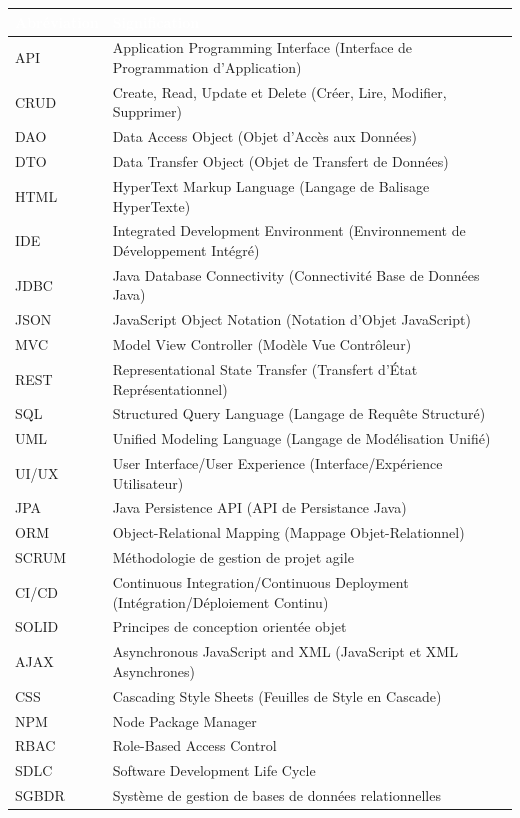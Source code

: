 \documentclass[12pt,a4paper,twoside,openright]{report}
\begin{document}
\begin{longtable}[]{@{}
  >{\raggedright\arraybackslash}p{}
  >{\raggedright\arraybackslash}p{}@{}}
\toprule
\rowcolor{capgeminiblue}
\textcolor{white}{\textbf{Abréviation}} & \textcolor{white}{\textbf{Signification}} \\
\midrule
\endhead
\rowcolor{lightgray}
API & Application Programming Interface (Interface de Programmation d'Application) \\
CRUD & Create, Read, Update et Delete (Créer, Lire, Modifier, Supprimer) \\
\rowcolor{lightgray}
DAO & Data Access Object (Objet d'Accès aux Données) \\
DTO & Data Transfer Object (Objet de Transfert de Données) \\
\rowcolor{lightgray}
HTML & HyperText Markup Language (Langage de Balisage HyperTexte) \\
IDE & Integrated Development Environment (Environnement de Développement Intégré) \\
\rowcolor{lightgray}
JDBC & Java Database Connectivity (Connectivité Base de Données Java) \\
JSON & JavaScript Object Notation (Notation d'Objet JavaScript) \\
\rowcolor{lightgray}
MVC & Model View Controller (Modèle Vue Contrôleur) \\
REST & Representational State Transfer (Transfert d'État Représentationnel) \\
\rowcolor{lightgray}
SQL & Structured Query Language (Langage de Requête Structuré) \\
UML & Unified Modeling Language (Langage de Modélisation Unifié) \\
\rowcolor{lightgray}
UI/UX & User Interface/User Experience (Interface/Expérience Utilisateur) \\
JPA & Java Persistence API (API de Persistance Java) \\
\rowcolor{lightgray}
ORM & Object-Relational Mapping (Mappage Objet-Relationnel) \\
SCRUM & Méthodologie de gestion de projet agile \\
\rowcolor{lightgray}
CI/CD & Continuous Integration/Continuous Deployment (Intégration/Déploiement Continu) \\
SOLID & Principes de conception orientée objet \\
\rowcolor{lightgray}
AJAX & Asynchronous JavaScript and XML (JavaScript et XML Asynchrones) \\
CSS & Cascading Style Sheets (Feuilles de Style en Cascade) \\
\rowcolor{lightgray}
NPM & Node Package Manager \\
RBAC & Role-Based Access Control \\
\rowcolor{lightgray}
SDLC & Software Development Life Cycle \\
SGBDR & Système de gestion de bases de données relationnelles \\
\bottomrule
\end{longtable}
\end{document}

